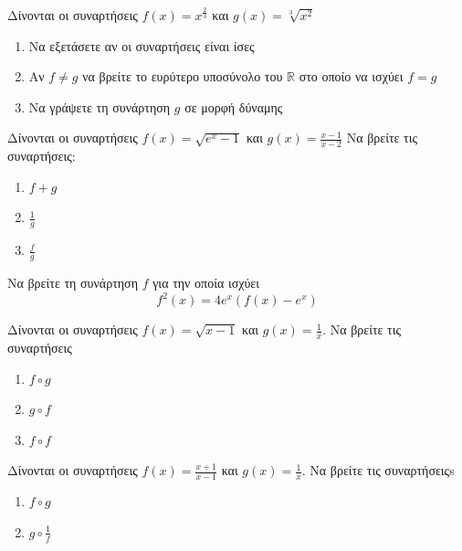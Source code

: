\documentclass{presentation}
\begin{document}
\begin{askisi}
      Δίνονται οι συναρτήσεις $f(x)=x^{\frac{2}{3}}$ και $g(x)=\sqrt[3]{x^2}$
      \begin{enumerate}
            \item<1-> Να εξετάσετε αν οι συναρτήσεις είναι ίσες
            \item<2-> Αν $f\ne g$ να βρείτε το ευρύτερο υποσύνολο του $\mathbb{R}$ στο οποίο να ισχύει $f=g$
            \item<3-> Να γράψετε τη συνάρτηση $g$ σε μορφή δύναμης
      \end{enumerate}

\end{askisi}

\begin{askisi}
      Δίνονται οι συναρτήσεις $f(x)=\sqrt{e^x-1}$ και $g(x)=\frac{x-1}{x-2}$
      Να βρείτε τις συναρτήσεις:
      \begin{enumerate}
            \item<1-> $f+g$
            \item<2-> $\frac{1}{g}$
            \item<3-> $\frac{f}{g}$
      \end{enumerate}

\end{askisi}

\begin{askisi}
      Να βρείτε τη συνάρτηση $f$ για την οποία ισχύει
      $$f^2(x)=4e^x\left(f(x)-e^x\right)$$

\end{askisi}

\begin{askisi}
      Δίνονται οι συναρτήσεις $f(x)=\sqrt{x-1}$ και $g(x)=\frac{1}{x}$. Να βρείτε τις συναρτήσεις
      \begin{enumerate}
            \item<1-> $f\circ g$
            \item<2-> $g\circ f$
            \item<3-> $f\circ f$
      \end{enumerate}

\end{askisi}

\begin{askisi}
      Δίνονται οι συναρτήσεις $f(x)=\frac{x+1}{x-1}$ και $g(x)=\frac{1}{x}$. Να βρείτε τις συναρτήσειςs
      \begin{enumerate}
            \item<1-> $f\circ g$
            \item<2-> $g\circ \frac{1}{f}$
      \end{enumerate}

\end{askisi}
\end{document}
